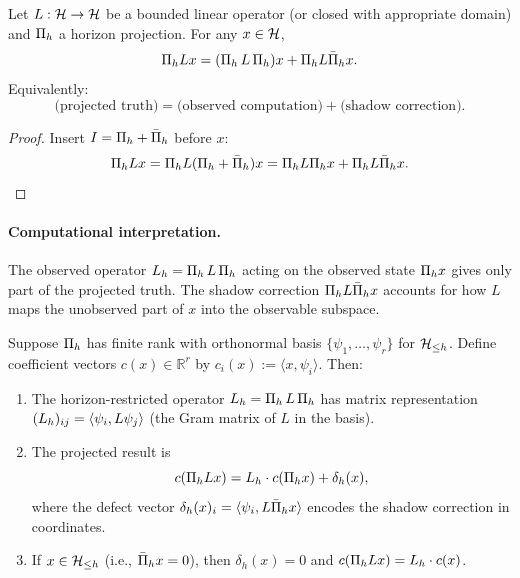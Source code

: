 \begin{lemma}
\label{lem:resolution-correction}
Let $L: \mathcal{H} \to \mathcal{H}$ be a bounded linear operator (or closed with appropriate domain) and $\Pi_{h}$ a horizon projection. For any $x \in \mathcal{H}$,
\[
\Pi_{h} L x = (\Pi_{h}\, L \,\Pi_{h}) x + \Pi_{h} L \bar{\Pi}_{h} x.
\]
Equivalently:
\[
\text{(projected truth)} = \text{(observed computation)} + \text{(shadow correction)}.
\]
\end{lemma}

\begin{proof}
Insert $I = \Pi_{h} + \bar{\Pi}_{h}$ before $x$:
\[
\Pi_{h} L x = \Pi_{h} L (\Pi_{h} + \bar{\Pi}_{h}) x = \Pi_{h} L \Pi_{h} x + \Pi_{h} L \bar{\Pi}_{h} x. \qedhere
\]
\end{proof}

\paragraph{Computational interpretation.}
The observed operator $L_{h} = \Pi_{h}\, L \,\Pi_{h}$ acting on the observed state $\Pi_{h} x$ gives only part of the projected truth. The shadow correction $\Pi_{h} L \bar{\Pi}_{h} x$ accounts for how $L$ maps the unobserved part of $x$ into the observable subspace.

\begin{lemma}
\label{lem:finite-rank-recipe}
Suppose $\Pi_{h}$ has finite rank with orthonormal basis $\{\psi_1, \ldots, \psi_r\}$ for $\mathcal{H}_{\le h}$.
Define coefficient vectors $c(x) \in \mathbb{R}^r$ by $c_i(x) := \langle x, \psi_i \rangle$.
Then:
\begin{enumerate}[label=(\roman*)]
\item The horizon-restricted operator $L_{h} = \Pi_{h}\, L \,\Pi_{h}$ has matrix representation $(L_{h})_{ij} = \langle \psi_i, L \psi_j \rangle$ (the Gram matrix of $L$ in the basis).
\item The projected result is
\[
c(\Pi_{h} L x) = L_{h} \cdot c(\Pi_{h} x) + \delta_h(x),
\]
where the defect vector $\delta_h(x)_i = \langle \psi_i, L \bar{\Pi}_{h} x \rangle$ encodes the shadow correction in coordinates.
\item If $x \in \mathcal{H}_{\le h}$ (i.e., $\bar{\Pi}_{h} x = 0$), then $\delta_h(x) = 0$ and $c(\Pi_{h} L x) = L_{h} \cdot c(x)$.
\end{enumerate}
\end{lemma}


